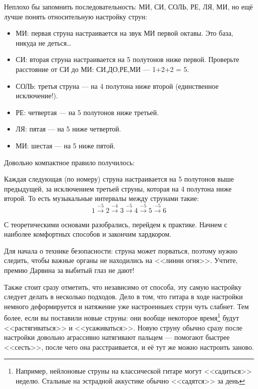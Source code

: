 Неплохо бы запомнить последовательность: МИ, СИ, СОЛЬ, РЕ, ЛЯ, МИ, но ещё лучше понять относительную настройку струн:
\begin{itemize}
    \item МИ: первая струна настраивается на звук МИ первой октавы. Это база, никуда не деться\ldots
    \item СИ: вторая струна настраивается на 5 полутонов ниже первой. Проверьте расстояние от СИ до МИ: СИ,ДО,РЕ,МИ --- 1+2+2 = 5.
    \item СОЛЬ: третья струна --- на 4 полутона ниже второй (единственное исключение!).
    \item РЕ: четвертая --- на 5 полутонов ниже третьей.
    \item ЛЯ: пятая --- на 5 ниже четвертой.
    \item МИ: шестая --- на 5 ниже пятой.
\end{itemize}

Довольно компактное правило получилось:
\begin{Rule}
    Каждая следующая (по номеру) струна настраивается на 5 полутонов выше предыдущей, за исключением третьей струны, которая на 4 полутона ниже второй. То есть музыкальные интервалы между струнами такие:
    \[
        \text{1}\xrightarrow{-5}
        \text{2}\xrightarrow{-4}
        \text{3}\xrightarrow{-5}
        \text{4}\xrightarrow{-5}
        \text{5}\xrightarrow{-5}
        \text{6}
    \]
\end{Rule}

С теоретическими основами разобрались, перейдем к практике. Начнем с наиболее комфортных способов и закончим хардкором.

Для начала о технике безопасности: струна может порваться, поэтому нужно следить, чтобы важные органы не находились на <<линии огня>>. Учтите, премию Дарвина за выбитый глаз не дают!

Также стоит сразу отметить, что независимо от способа, эту самую настройку следует делать в несколько подходов. Дело в том, что гитара в ходе настройки немного деформируется и натяжение уже настроенныех струн чуть слабнет. Тем более, если вы поставили новые струны: они вообще некоторое время\footnote{Например, нейлоновые струны на классической гитаре могут <<садиться>> неделю. Стальные на эстрадной аккустике обычно <<садятся>> за день} будут <<растягиваться>> и <<усаживаться>>. Новую струну обычно сразу после настройки довольно аграссивно натягивают пальцем --- помогают быстрее <<сесть>>, после чего она расстраивается, и её тут же можно настроить заново.

